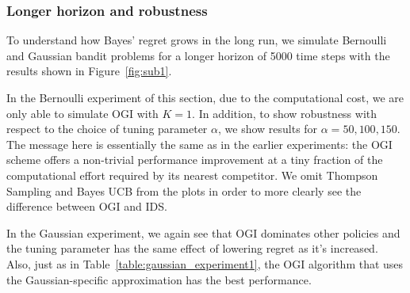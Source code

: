 \subsubsection{Longer horizon and robustness}
To understand how Bayes' regret grows in the long run, we simulate Bernoulli and Gaussian bandit problems for a longer horizon of 5000 time steps with the results shown in Figure~\ref{fig:sub1}. 

In the Bernoulli experiment of this section, due to the computational cost, we are only able to simulate OGI with $K = 1$. In addition, to show robustness with respect to the choice of tuning parameter $\alpha$, we show results for $\alpha = 50,100,150$. The message here is essentially the same as in the earlier experiments: the OGI scheme offers a non-trivial performance improvement at a tiny fraction of the computational effort required by its nearest competitor. We omit Thompson Sampling and Bayes UCB from the plots in order to more clearly see the difference between OGI and IDS.

In the Gaussian experiment, we again see that OGI dominates other policies and the tuning parameter has the same effect of lowering regret as it's increased. Also, just as in Table~\ref{table:gaussian_experiment1}, the OGI algorithm that uses the Gaussian-specific approximation has the best performance. 
